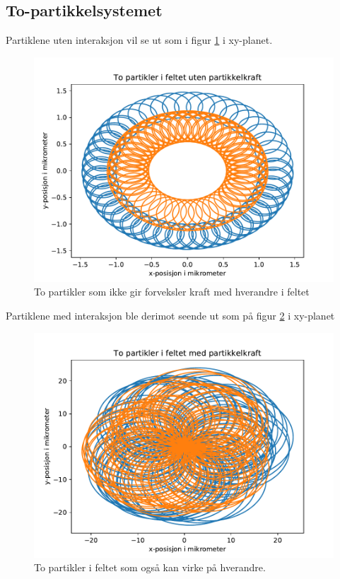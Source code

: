 \documentclass[reprint,english,notitlepage]{revtex4-1}  %
\begin{document}
\subsection*{To-partikkelsystemet}
Partiklene uten interaksjon vil se ut som i figur \ref{r2noint} i xy-planet.
\begin{figure}
	\label{r2noint}
	\centering 
	\includegraphics[scale=0.4]{../pythonplots/xypartnoint.pdf}
	\caption{To partikler som ikke gir forveksler kraft med hverandre i feltet}
\end{figure}
Partiklene med interaksjon ble derimot seende ut som på figur \ref{r2int} i xy-planet
\begin{figure}
	\label{r2int}
	\centering 
	\includegraphics[scale=0.4]{../pythonplots/xypartint.pdf}
	\caption{To partikler i feltet som også kan virke på hverandre.}
\end{figure}
\end{document}
